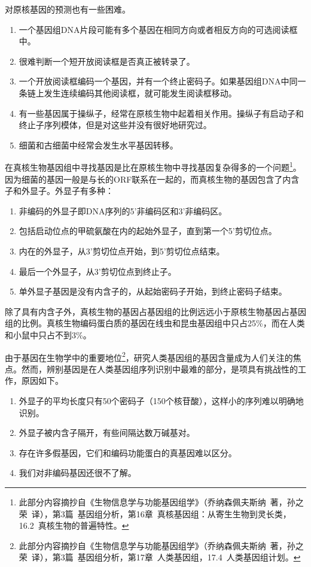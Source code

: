\documentclass[11pt,a4paper,twoside]{book}
\begin{document}
{对原核基因的预测也有一些困难。
\begin{enumerate}
  \item 一个基因组DNA片段可能有多个基因在相同方向或者相反方向的可选阅读框中。
  \item 很难判断一个短开放阅读框是否真正被转录了。
  \item
    一个开放阅读框编码一个基因，并有一个终止密码子。如果基因组DNA中同一条链上发生连续编码其他阅读框，就可能发生阅读框移动。
  \item 有一些基因属于操纵子，经常在原核生物中起着相关作用。操纵子有启动子和终止子序列模体，但是对这些并没有很好地研究过。
  \item 细菌和古细菌中经常会发生水平基因转移。
\end{enumerate}

在真核生物基因组中寻找基因是比在原核生物中寻找基因复杂得多的一个问题\footnote{此部分内容摘抄自《生物信息学与功能基因组学》（乔纳森\textbullet 佩夫斯纳\ 著，孙之荣\ 译），第3篇\ 基因组分析，第16章\ 真核基因组：从寄生生物到灵长类，16.2\ 真核生物的普遍特性。}。因为细菌的基因一般是与长的ORF联系在一起的，而真核生物的基因包含了内含子和外显子。外显子有多种：
\begin{enumerate}
  \item 非编码的外显子即DNA序列的5'非编码区和3'非编码区。
  \item 包括启动位点的甲硫氨酸在内的起始外显子，直到第一个5'剪切位点。
  \item 内在的外显子，从3'剪切位点开始，到5'剪切位点结束。
  \item 最后一个外显子，从3'剪切位点到终止子。
  \item 单外显子基因是没有内含子的，从起始密码子开始，到终止密码子结束。
\end{enumerate}
除了具有内含子外，真核生物的基因占基因组的比例远远小于原核生物基因占基因组的比例。真核生物编码蛋白质的基因在线虫和昆虫基因组中只占25\%，而在人类和小鼠中只占不到3\%。

由于基因在生物学中的重要地位\footnote{此部分内容摘抄自《生物信息学与功能基因组学》（乔纳森\textbullet 佩夫斯纳\ 著，孙之荣\ 译），第3篇\ 基因组分析，第17章\ 人类基因组，17.4\ 人类基因组计划。}，研究人类基因组的基因含量成为人们关注的焦点。然而，辨别基因是在人类基因组序列识别中最难的部分，是项具有挑战性的工作，原因如下。
\begin{enumerate}
  \item 外显子的平均长度只有50个密码子（150个核苷酸），这样小的序列难以明确地识别。
  \item 外显子被内含子隔开，有些间隔达数万碱基对。
  \item 存在许多假基因，它们和编码功能蛋白的真基因难以区分。
  \item 我们对非编码基因还很不了解。
\end{enumerate}

}
\end{document}
